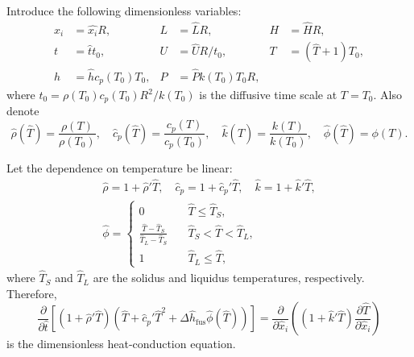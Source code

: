 \documentclass{article}
\newcommand{\pder}[2][]{\frac{\partial#1}{\partial#2}}
\newcommand{\idx}[2][]{#1_{\mathrm{#2}}}
\begin{document}
Introduce the following dimensionless variables:
\begin{equation}\label{eq:dimensionless}
    \begin{aligned}
        x_i &= \hat{x_i}R, & L &= \hat{L}R, & H &= \hat{H}R, \\
        t &= \hat{t}t_0, & U &= \hat{U}R/t_0, & T &= (\hat{T}+1)T_0, \\
        h &= \hat{h}c_p(T_0)T_0, & P &= \hat{P} k(T_0)T_0R,
    \end{aligned}
\end{equation}
where \(t_0=\rho(T_0) c_p(T_0) R^2/k(T_0)\) is the diffusive time scale at \(T=T_0\).
Also denote
\begin{equation}
    \hat{\rho}(\hat{T}) = \frac{\rho(T)}{\rho(T_0)}, \quad
    \hat{c}_p(\hat{T}) = \frac{c_p(T)}{c_p(T_0)}, \quad
    \hat{k}(\hat{T}) = \frac{k(T)}{k(T_0)}, \quad
    \hat{\phi}(\hat{T}) = \phi(T).
\end{equation}

Let the dependence on temperature be linear:
\begin{gather}
	\hat{\rho} = 1 + \hat{\rho}'\hat{T}, \quad
	\hat{c}_p = 1 + \hat{c}_p'\hat{T}, \quad
	\hat{k} = 1 + \hat{k}'\hat{T}, \\
	\hat{\phi} = \begin{cases}
        0 & \quad \hat{T} \leq \hat{T}_S, \\
        \frac{\hat{T}-\hat{T}_S}{\hat{T}_L-\hat{T}_S} & \quad \hat{T}_S < \hat{T} < \hat{T}_L, \\
        1 & \quad \hat{T}_L \leq \hat{T},
    \end{cases}
\end{gather}
where \(\hat{T}_S\) and \(\hat{T}_L\) are the solidus and liquidus temperatures, respectively.
Therefore,
\begin{equation}\label{eq:heat_conduction2}
	\pder{\hat{t}}\left[\left(1 + \hat{\rho}'\hat{T}\right)
	    \left(\hat{T} + \hat{c}_p'\hat{T}^2 + \Delta\idx[\hat{h}]{fus}\hat{\phi}(\hat{T})\right)\right]
	    = \pder{\hat{x}_i}\left(\left(1 + \hat{k}'\hat{T}\right)\pder[\hat{T}]{\hat{x}_i}\right)
\end{equation}
is the dimensionless heat-conduction equation.

\begin{comment}
C = C_1 + (C_2-C_1)\frac{T-T_1}{T_2-T_1}
C_0 = C(T=T_0)
C = C_0 + (C_2-C_0)\frac{\hat{T}-1}{\hat{T_2}-1}

[pV] = [Fs] = J
[k] = J/m/K/s
[c] = J/kg/K
[\rho c] = J/K/m^3
[H] = J/kg
[h] = J/m^3 = [H\rho]


\pder[h]{t} = \pder{x_i}\left(k\pder[T]{x_i}\right)
J/m^3/s = K/m^2 [k]
[k] = J/m/K/s
[kT/L] = [P/L^2]
[P] = [kTL]
\end{comment}
\end{document}
